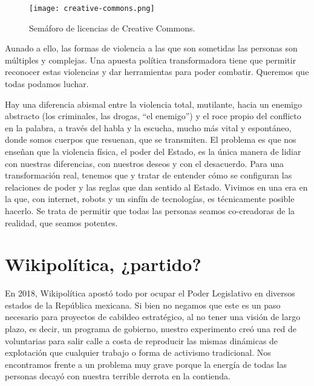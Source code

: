 \begin{figure}[htbp]
	\centering
	\texttt{[image: creative-commons.png]}
	\caption{Semáforo de licencias de Creative Commons.}
	\label{fig:CCsignal}
\end{figure}

Aunado a ello, las formas de violencia a las que son sometidas las personas son múltiples y complejas. Una apuesta política transformadora tiene que permitir reconocer estas violencias y dar herramientas para poder combatir. Queremos que todas podamos luchar.

Hay una diferencia abismal entre la violencia total, mutilante, hacia un enemigo abstracto (los criminales, las drogas, \enquote{el enemigo}\revquotes{}) y el roce propio del conflicto en la palabra, a través del habla y la escucha, mucho más vital y espontáneo, donde somos cuerpos que resuenan, que se transmiten. El problema es que nos enseñan que la violencia física, el poder del Estado, es la única manera de lidiar con nuestras diferencias, con nuestros deseos y con el desacuerdo. Para una transformación real, tenemos que  y tratar de entender cómo se configuran las relaciones de poder y las reglas que dan sentido al Estado. Vivimos en una era en la que, con internet, robots y un sinfín de tecnologías, es técnicamente posible hacerlo. Se trata de permitir que todas las personas seamos co-creadoras de la realidad, que seamos potentes.

\section{Wikipolítica, ¿partido?}
\label{sec:wikipartido}

En 2018, Wikipolítica apostó todo por ocupar el Poder Legislativo en diversos estados de la República mexicana. Si bien no negamos que este es un paso necesario para proyectos de cabildeo estratégico, al no tener una visión de largo plazo, es decir, un programa de gobierno, nuestro experimento creó una red de voluntarias para salir calle a costa de reproducir las mismas dinámicas de explotación que cualquier trabajo o forma de activismo tradicional. Nos encontramos frente a un problema muy grave porque la energía de todas las personas decayó con nuestra terrible derrota en la contienda.

